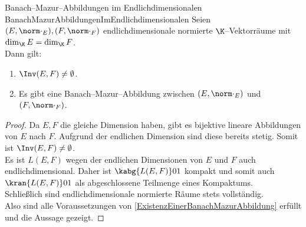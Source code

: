 \begin{korollar}{Banach--Mazur--Abbildungen im Endlichdimensionalen}
                {BanachMazurAbbildungenImEndlichdimensionalen}
Seien $(E, \norm\cdot_E), (F, \norm\cdot_F)$ endlichdimensionale normierte
$\K$--Vektorräume mit $\dim_\K E = \dim_\K F$.\\
Dann gilt:
\begin{enumerate}[(1)]
\item\label{BanachMazurAbbildungenImEndlichdimensionalen1}
  $\Inv(E, F) \neq \emptyset$.
\item\label{BanachMazurAbbildungenImEndlichdimensionalen2}
 Es gibt eine Banach--Mazur--Abbildung zwischen $(E, \norm\cdot_E)$ und
$(F, \norm\cdot_F)$.
\end{enumerate}
\end{korollar}
\begin{proof}
Da $E, F$ die gleiche Dimension haben, gibt es bijektive lineare Abbildungen
von $E$ nach $F$. Aufgrund der endlichen Dimension sind diese bereits stetig.
Somit ist $\Inv(E, F) \neq \emptyset$.\\
Es ist $L(E, F)$ wegen der endlichen Dimensionen von $E$ und $F$ auch
endlichdimensional. 
Daher ist $\kabg{L(E, F)}01$ kompakt und somit auch $\kran{L(E, F)}01$ als abgeschlossene Teilmenge eines Kompaktums.\\
Schließlich sind endlichdimensionale normierte Räume stets vollständig.\\
Also sind alle Voraussetzungen von \ref{ExistenzEinerBanachMazurAbbildung}
erfüllt und die Aussage gezeigt.
\end{proof}